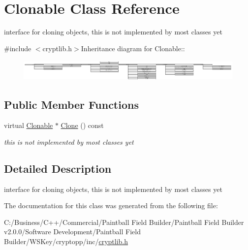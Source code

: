 \hypertarget{class_clonable}{
\section{Clonable Class Reference}
\label{class_clonable}
}


interface for cloning objects, this is not implemented by most classes yet  


{\ttfamily \#include $<$cryptlib.h$>$}Inheritance diagram for Clonable::\begin{figure}[H]
\begin{center}
\leavevmode
\includegraphics[height=1.1123cm]{class_clonable}
\end{center}
\end{figure}
\subsection*{Public Member Functions}
\begin{DoxyCompactItemize}
\item 
\hypertarget{class_clonable_a24b43349a71e1f98508eeb10b31a0a62}{
virtual \hyperlink{class_clonable}{Clonable} $\ast$ \hyperlink{class_clonable_a24b43349a71e1f98508eeb10b31a0a62}{Clone} () const }
\label{class_clonable_a24b43349a71e1f98508eeb10b31a0a62}

\begin{DoxyCompactList}\small\item\em this is not implemented by most classes yet \item\end{DoxyCompactList}\end{DoxyCompactItemize}


\subsection{Detailed Description}
interface for cloning objects, this is not implemented by most classes yet 

The documentation for this class was generated from the following file:\begin{DoxyCompactItemize}
\item 
C:/Business/C++/Commercial/Paintball Field Builder/Paintball Field Builder v2.0.0/Software Development/Paintball Field Builder/WSKey/cryptopp/inc/\hyperlink{cryptlib_8h}{cryptlib.h}\end{DoxyCompactItemize}
